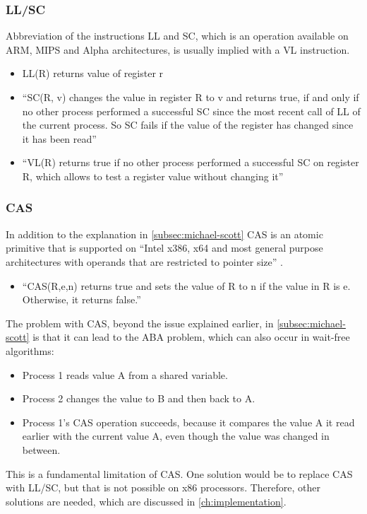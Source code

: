 \subsubsection{\acf{LL/SC}}\label{subsubsec:llsc}
Abbreviation of the instructions \ac{LL} and \ac{SC}, which is an operation available on ARM, MIPS and Alpha architectures, is usually implied with a \ac{VL} instruction.
\begin{itemize}
    \item \ac{LL}(R) returns value of register r
    \item \enquote{\ac{SC}(R, v) changes the value in register R to v and returns true, if and only if no other process performed a successful SC since the most recent call of LL of the current process. So SC fails if the value of the register has changed since it has been read} \cite{Fuchs2014EvaluationOT}
    \item \enquote{\ac{VL}(R) returns true if no other process performed a successful SC on register R, which allows to test a register value without changing it} \cite{Fuchs2014EvaluationOT}
\end{itemize}
\cite{Fuchs2014EvaluationOT}

\subsubsection{\acf{CAS}}\label{subsubsec:compare-and-swap}
In addition to the explanation in \cref{subsec:michael-scott} \ac{CAS} is an atomic primitive that is supported on \enquote{Intel x386, x64 and most general purpose architectures with operands that are restricted to pointer size} \cite{Fuchs2014EvaluationOT}.
\begin{itemize}
    \item \enquote{\ac{CAS}(R,e,n) returns true and sets the value of R to n if the value in R is e. Otherwise, it returns false.} \cite{Fuchs2014EvaluationOT}
\end{itemize}
The problem with \ac{CAS}, beyond the issue explained earlier, in \cref{subsec:michael-scott} is that it can lead to the ABA problem, which can also occur in wait-free algorithms:
\begin{itemize}
    \item Process 1 reads value A from a shared variable.
    \item Process 2 changes the value to B and then back to A.
    \item Process 1's \ac{CAS} operation succeeds, because it compares the value A it read earlier with the current value A, even though the value was changed in between.
\end{itemize}
This is a fundamental limitation of \ac{CAS}. One solution would be to replace \ac{CAS} with \ac{LL/SC}, but that is not possible on x86 processors. Therefore, other solutions are needed, which are discussed in \cref{ch:implementation}. \cite{Fuchs2014EvaluationOT}


